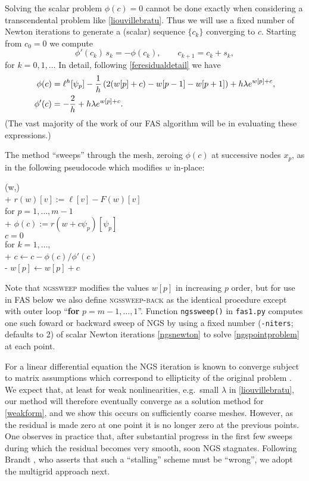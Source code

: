 \documentclass[letterpaper,final,12pt,reqno]{amsart}
\begin{document}
Solving the scalar problem $\phi(c)=0$ cannot be done exactly when considering a transcendental problem like \eqref{liouvillebratu}.  Thus we will use a fixed number of Newton iterations \cite[Chapter 4]{Bueler2021} to generate a (scalar) sequence $\{c_k\}$ converging to $c$.  Starting from $c_0=0$ we compute
\begin{equation}
\phi'(c_k)\, s_k = -\phi(c_k),  \qquad  c_{k+1} = c_k + s_k, \label{ngsnewton}
\end{equation}
for $k=0,1,\dots$  In detail, following \eqref{feresidualdetail} we have
\begin{align}
   \phi(c) &= \ell^h[\psi_p] - \frac{1}{h} \left(2(w[p]+c) - w[p-1] - w[p+1]\right) + h \lambda e^{w[p]+c}, \label{ngsnewtondetails} \\
   \phi'(c) &= -\frac{2}{h} + h \lambda e^{w[p]+c}. \notag
\end{align}
(The vast majority of the work of our FAS algorithm will be in evaluating these expressions.)

The method ``sweeps'' through the mesh, zeroing $\phi(c)$ at successive nodes $x_p$, as in the following pseudocode which modifies $w$ in-place:

\begin{pseudo*}
(w,\ell)\text{:} \\+
    $r(w)[v] := \ell[v] - F(w)[v]$ \\
    for $p=1,\dots,m-1$ \\+
        $\phi(c) := r(w + c \psi_p)[\psi_p]$ \\
        $c=0$ \\
        for $k=1,\dots,$ \\+
            $c \gets c - \phi(c) / \phi'(c)$ \\-
        $w[p] \gets w[p] + c$
\end{pseudo*}

Note that \textsc{ngssweep} modifies the values $w[p]$ in increasing $p$ order, but for use in FAS below we also define \textsc{ngssweep-back} as the identical procedure except with outer loop ``\textbf{for} $p=m-1,\dots,1$''.  Function \texttt{ngssweep()} in \texttt{fas1.py} computes one such foward or backward sweep of NGS by using a fixed number (\texttt{-niters}; defaults to 2) of scalar Newton iterations \eqref{ngsnewton} to solve \eqref{ngspointproblem} at each point.

For a linear differential equation the NGS iteration is known to converge subject to matrix assumptions which correspond to ellipticity of the original problem \cite[for example]{Greenbaum1997}.  We expect that, at least for weak nonlinearities, e.g.~small $\lambda$ in \eqref{liouvillebratu}, our method will therefore eventually converge as a solution method for \eqref{weakform}, and we show this occurs on sufficiently coarse meshes.  However, as the residual is made zero at one point it is no longer zero at the previous points.  One observes in practice that, after substantial progress in the first few sweeps during which the residual becomes very smooth, soon NGS stagnates.  Following Brandt \cite{Brandt1977,BrandtLivne2011}, who asserts that such a ``stalling'' scheme must be ``wrong'', we adopt the multigrid approach next.
\end{document}

